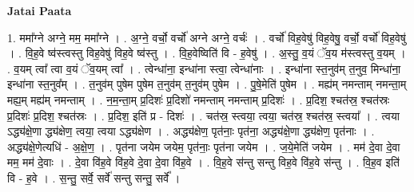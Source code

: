 \documentclass[17pt]{extarticle}
\begin{document}
\textbf{Jatai Paata} \newline

1. ममा᳚ग्ने अग्ने॒ मम॒ ममा᳚ग्ने । . अ॒ग्ने॒ वर्चो॒ वर्चो॑ अग्ने अग्ने॒ वर्चः॑ । . वर्चो॑ विह॒वेषु॑ विह॒वेषु॒ वर्चो॒ वर्चो॑ विह॒वेषु॑ । . वि॒ह॒वे ष्व॑स्त्वस्तु विह॒वेषु॑ विह॒वे ष्व॑स्तु । . वि॒ह॒वेष्विति॑ वि - ह॒वेषु॑ । . अ॒स्तु॒ व॒यं ॅव॒य म॑स्त्वस्तु व॒यम् । . व॒यम् त्वा᳚ त्वा व॒यं ॅव॒यम् त्वा᳚ । . त्वेन्धा॑ना॒ इन्धा॑ना स्त्वा॒ त्वेन्धा॑नाः । . इन्धा॑ना स्त॒नुव॑म् त॒नुव॒ मिन्धा॑ना॒ इन्धा॑ना स्त॒नुव᳚म् । . त॒नुव॑म् पुषेम पुषेम त॒नुव॑म् त॒नुव॑म् पुषेम । . पु॒षे॒मेति॑ पुषेम । . मह्य॑म् नमन्ताम् नमन्ता॒म् मह्य॒म् मह्य॑म् नमन्ताम् । . न॒म॒न्ता॒म् प्र॒दिशः॑ प्र॒दिशो॑ नमन्ताम् नमन्ताम् प्र॒दिशः॑ । . प्र॒दिश॒ श्चत॑स्र॒ श्चत॑स्रः प्र॒दिशः॑ प्र॒दिश॒ श्चत॑स्रः । . प्र॒दिश॒ इति॑ प्र - दिशः॑ । . चत॑स्र॒ स्त्वया॒ त्वया॒ चत॑स्र॒ श्चत॑स्र॒ स्त्वया᳚ । . त्वया ऽद्ध्य॑क्षे॒णा द्ध्य॑क्षेण॒ त्वया॒ त्वया ऽद्ध्य॑क्षेण । . अद्ध्य॑क्षेण॒ पृत॑नाः॒ पृत॑ना॒ अद्ध्य॑क्षे॒णा द्ध्य॑क्षेण॒ पृत॑नाः । . अद्ध्य॑क्षे॒णेत्यधि॑ - अ॒क्षे॒ण॒ । . पृत॑ना जयेम जयेम॒ पृत॑नाः॒ पृत॑ना जयेम । . ज॒ये॒मेति॑ जयेम । . मम॑ दे॒वा दे॒वा मम॒ मम॑ दे॒वाः । . दे॒वा वि॑ह॒वे वि॑ह॒वे दे॒वा दे॒वा वि॑ह॒वे । . वि॒ह॒वे स॑न्तु सन्तु विह॒वे वि॑ह॒वे स॑न्तु । . वि॒ह॒व इति॑ वि - ह॒वे । . स॒न्तु॒ सर्वे॒ सर्वे॑ सन्तु सन्तु॒ सर्वे᳚ । \newline
\end{document}
